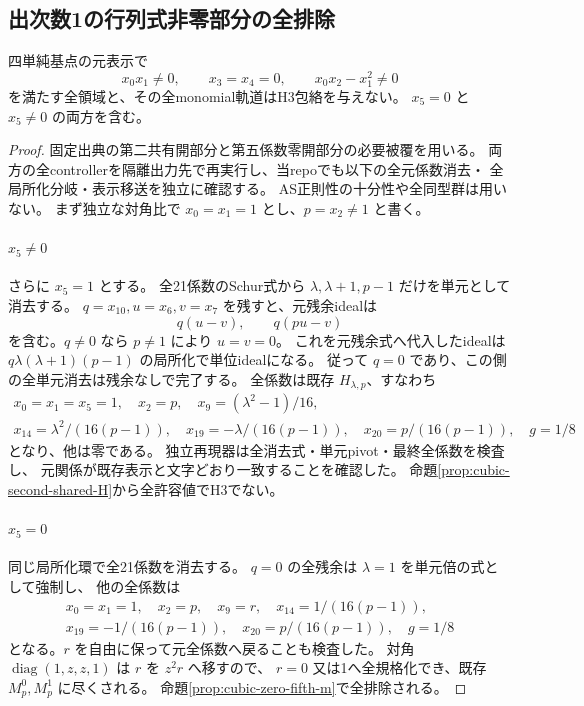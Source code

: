 \subsection{出次数1の行列式非零部分の全排除}
\label{subsec:cubic-CY-four-point-two-open}
\begin{theorem}\label{thm:cubic-CY-four-point-two-open-empty}
四単純基点の元表示で
\[
 x_0x_1\ne0,\qquad x_3=x_4=0,\qquad x_0x_2-x_1^2\ne0
\]
を満たす全領域と、その全monomial軌道はH3包絡を与えない。
$x_5=0$ と $x_5\ne0$ の両方を含む。
\end{theorem}
\begin{proof}
固定出典\cite{AS4CYpinned}の第二共有開部分と第五係数零開部分の必要被覆を用いる。
両方の全controllerを隔離出力先で再実行し、当repoでも以下の全元係数消去・
全局所化分岐・表示移送を独立に確認する。
AS正則性の十分性や全同型群は用いない。
まず独立な対角比で $x_0=x_1=1$ とし、$p=x_2\ne1$ と書く。

\paragraph{$x_5\ne0$}
さらに $x_5=1$ とする。
全21係数のSchur式から $\lambda,\lambda+1,p-1$ だけを単元として消去する。
$q=x_{10},u=x_6,v=x_7$ を残すと、元残余idealは
\[
 q(u-v),\qquad q(pu-v)
\]
を含む。$q\ne0$ なら $p\ne1$ により $u=v=0$。
これを元残余式へ代入したidealは $q\lambda(\lambda+1)(p-1)$ の局所化で単位idealになる。
従って $q=0$ であり、この側の全単元消去は残余なしで完了する。
全係数は既存 $H_{\lambda,p}$、すなわち
\[
\begin{gathered}
 x_0=x_1=x_5=1,\quad x_2=p,\quad x_9=(\lambda^2-1)/16,\\
 x_{14}=\lambda^2/(16(p-1)),\quad x_{19}=-\lambda/(16(p-1)),\quad
 x_{20}=p/(16(p-1)),\quad g=1/8
\end{gathered}
\]
となり、他は零である。
独立再現器は全消去式・単元pivot・最終全係数を検査し、
元関係が既存表示と文字どおり一致することを確認した。
命題\ref{prop:cubic-second-shared-H}から全許容値でH3でない。

\paragraph{$x_5=0$}
同じ局所化環で全21係数を消去する。
$q=0$ の全残余は $\lambda=1$ を単元倍の式として強制し、
他の全係数は
\[
\begin{gathered}
 x_0=x_1=1,\quad x_2=p,\quad x_9=r,\quad
 x_{14}=1/(16(p-1)),\\
 x_{19}=-1/(16(p-1)),\quad x_{20}=p/(16(p-1)),\quad g=1/8
\end{gathered}
\]
となる。$r$ を自由に保って元全係数へ戻ることも検査した。
対角 $\operatorname{diag}(1,z,z,1)$ は $r$ を $z^2r$ へ移すので、
$r=0$ 又は1へ全規格化でき、既存 $M^0_p,M^1_p$ に尽くされる。
命題\ref{prop:cubic-zero-fifth-m}で全排除される。


\end{proof}
